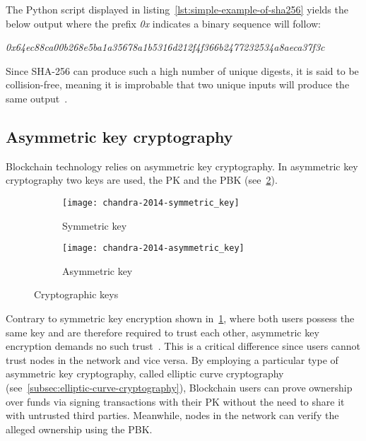 The Python script displayed in listing~\ref{lst:simple-example-of-sha256} yields the below output where the prefix \emph{0x} indicates a binary sequence will follow:

\smallskip
\begingroup\small\emph{0x64ec88ca00b268e5ba1a35678a1b5316d212f4f366b2477232534a8aeca37f3c}\endgroup
\smallskip

Since SHA-256 can produce such a high number of unique digests, it is said to be collision-free, meaning it is improbable that two unique inputs will produce the same output~\autocite[8]{yaga_blockchain_2018}.

\subsection{Asymmetric key cryptography}\label{subsec:asymmetric-key-cryptography}

\Gls{Blockchain} technology relies on asymmetric key cryptography.
In asymmetric key cryptography two keys are used, the \gls{PK} and the \gls{PBK} (see~\cref{fig:asymmetric-key}).

\begin{figure}[H]
    \begin{subfigure}[b]{\textwidth}
        \centering
        \texttt{[image: chandra-2014-symmetric\_key]}
        \caption{Symmetric key}
        \label{fig:symmetric-key}
    \end{subfigure}
    \begin{subfigure}[b]{\textwidth}
        \centering
        \texttt{[image: chandra-2014-asymmetric\_key]}
        \caption{Asymmetric key}
        \label{fig:asymmetric-key}
    \end{subfigure}
    \caption[Cryptographic keys]{Cryptographic keys~\autocite[84]{chandra_comparative_2014}}\label{fig:cryptographic-keys}
\end{figure}

Contrary to symmetric key encryption shown in~\cref{fig:symmetric-key}, where both users possess the same key and are therefore required to trust each other, asymmetric key encryption demands no such trust~\autocites[84]{chandra_comparative_2014}[11]{yaga_blockchain_2018}.
This is a critical difference since users cannot trust nodes in the network and vice versa.
By employing a particular type of asymmetric key cryptography, called elliptic curve cryptography (see~\cref{subsec:elliptic-curve-cryptography}), \gls{Blockchain} users can prove ownership over funds via signing transactions with their \gls{PK} without the need to share it with untrusted third parties.
Meanwhile, nodes in the network can verify the alleged ownership using the \gls{PBK}.


